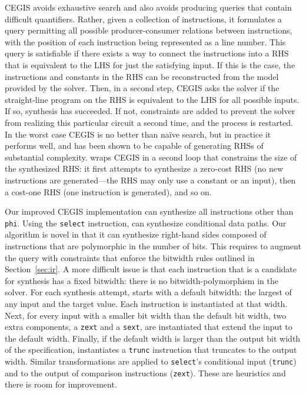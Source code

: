 CEGIS avoids exhaustive search and also avoids producing queries that
contain difficult quantifiers.
%
Rather, given a collection of instructions, it formulates a query
permitting all possible producer-consumer relations between
instructions, with the position of each instruction being represented
as a line number.
%
This query is satisfiable if there exists a way to connect the
instructions into a RHS that is equivalent to the LHS for just the
satisfying input.
%
If this is the case, the instructions and constants in the RHS can be
reconstructed from the model provided by the solver.
%
Then, in a second step, CEGIS asks the solver if the straight-line
program on the RHS is equivalent to the LHS for all possible inputs.
%
If so, synthesis has succeeded.
%
If not, constraints are added to prevent the solver from realizing
this particular circuit a second time, and the process is restarted.
%
In the worst case CEGIS is no better than naïve search, but in
practice it performs well, and has been shown to be capable of
generating RHSs of substantial complexity.
%
\tool{} wraps CEGIS in a second loop that constrains the size of the
synthesized RHS: it first attempts to synthesize a zero-cost RHS (no
new instructions are generated---the RHS may only use a constant or an
input), then a cost-one RHS (one instruction is generated), and so on.


Our improved CEGIS implementation can synthesize all \tool{} instructions
other than \texttt{phi}.
%
Using the \texttt{select} instruction, \tool{} can synthesize conditional
data paths.
%
Our algorithm is novel in that it can synthesize right-hand sides
composed of instructions that are polymorphic in the number of bits.
%
This requires \tool{} to augment the query with constraints that
enforce the bitwidth rules outlined in Section~\ref{sec:ir}.
%
A more difficult issue is that each instruction that is a candidate
for synthesis has a fixed bitwidth: there is no bitwidth-polymorphism
in the solver.
%
For each synthesis attempt, \tool{} starts with a default bitwidth:
the largest of any input and the target value.
%
Each instruction is instantiated at that width.
%
Next, for every input with a smaller bit width than the default bit
width, two extra components, a \texttt{zext} and a \texttt{sext}, are
instantiated that extend the input to the default width.
%
Finally, if the default width is larger than the output bit width of
the specification, \tool{} instantiates a \texttt{trunc} instruction
that truncates to the output width.
%
Similar transformations are applied to \texttt{select}'s conditional
input (\texttt{trunc}) and to the output of comparison instructions
 (\texttt{zext}).
%
These are heuristics and there is room for improvement.


